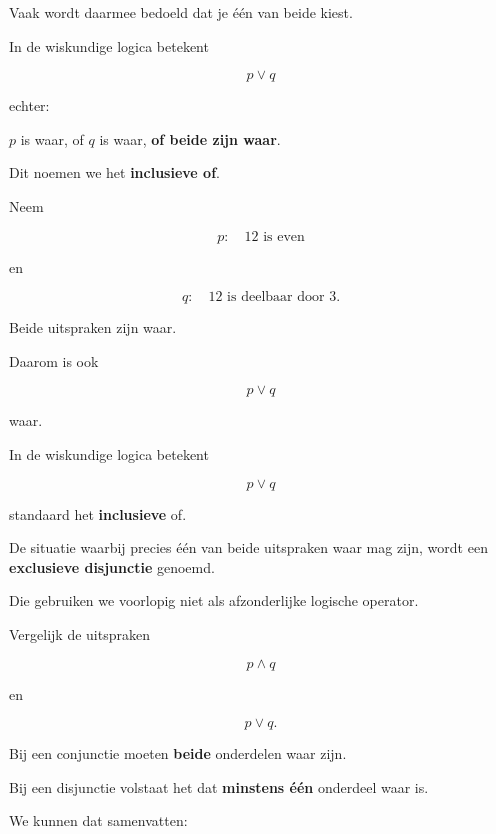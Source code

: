 \documentclass{ximera}
\begin{document}
  Vaak wordt daarmee bedoeld dat je één van beide kiest.

  In de wiskundige logica betekent

  \[
  p\lor q
  \]

  echter:

  \begin{center}
  $p$ is waar, of $q$ is waar, \textbf{of beide zijn waar}.
  \end{center}


  Dit noemen we het \textbf{inclusieve of}.


  \begin{voorbeeld}

  Neem

  \[
  p:\quad 12\text{ is even}
  \]

  en

  \[
  q:\quad 12\text{ is deelbaar door }3.
  \]

  Beide uitspraken zijn waar.

  Daarom is ook

  \[
  p\lor q
  \]

  waar.
  \end{voorbeeld}


  \begin{opmerking}
  In de wiskundige logica betekent

  \[
  p\lor q
  \]

  standaard het \textbf{inclusieve} of.

  De situatie waarbij precies één van beide uitspraken waar mag zijn,
  wordt een \textbf{exclusieve disjunctie} genoemd.

  Die gebruiken we voorlopig niet als afzonderlijke logische operator.
  \end{opmerking}



  Vergelijk de uitspraken

  \[
  p\land q
  \]

  en

  \[
  p\lor q.
  \]

  Bij een conjunctie moeten \textbf{beide} onderdelen waar zijn.

  Bij een disjunctie volstaat het dat \textbf{minstens één} onderdeel
  waar is.

  We kunnen dat samenvatten:
\end{document}
